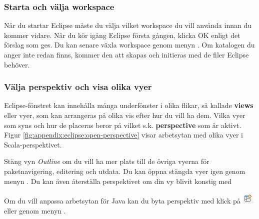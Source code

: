 \subsubsection{Starta och välja workspace}\label{subsubsection:start:eclipse}

När du startar Eclipse måste du välja vilket workspace du vill använda innan du kommer vidare. När du kör igång Eclipse första gången, klicka OK enligt det förslag som ges. Du kan senare växla workspace genom menyn . Om katalogen du anger inte redan finns, kommer den att skapas och initieras med de filer Eclipse behöver.

%

\subsubsection{Välja perspektiv och visa olika vyer}

Eclipse-fönstret kan innehålla många underfönster i olika flikar, så kallade \textbf{views} eller vyer, som kan arrangeras på olika vis efter hur du vill ha dem. Vilka vyer som syns och hur de placeras beror på vilket s.k. \textbf{perspective} som är aktivt.  Figur \ref{fig:appendix:eclipse:open-perspective} visar arbetsytan med olika vyer i Scala-perspektivet.

Stäng vyn \textit{Outline} om du vill ha mer plats till de övriga vyerna för paketnavigering, editering och utdata. Du kan öppna stängda vyer igen genom menyn .
Du kan även återställa perspektivet om din vy blivit konstig med 

Om du vill anpassa arbetsytan för Java kan du byta perspektiv med klick på \includegraphics[scale=0.75]{../img/eclipse/eclipse-perspective-button.png} eller genom menyn .

